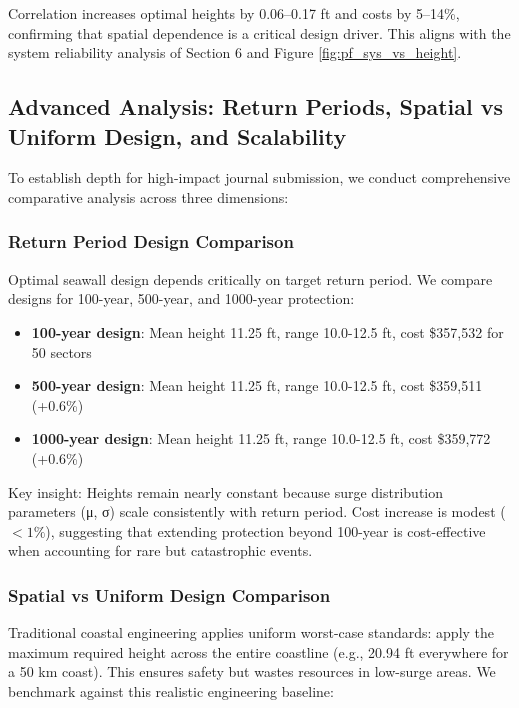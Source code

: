 \documentclass[review]{elsarticle}
\begin{document}
Correlation increases optimal heights by 0.06--0.17 ft and costs by 5--14\%, confirming that spatial dependence is a critical design driver. This aligns with the system reliability analysis of Section 6 and Figure \ref{fig:pf_sys_vs_height}.

\subsection{Advanced Analysis: Return Periods, Spatial vs Uniform Design, and Scalability}

To establish depth for high-impact journal submission, we conduct comprehensive comparative analysis across three dimensions:

\subsubsection{Return Period Design Comparison}

Optimal seawall design depends critically on target return period. We compare designs for 100-year, 500-year, and 1000-year protection:

\begin{itemize}
\item \textbf{100-year design}: Mean height 11.25 ft, range 10.0-12.5 ft, cost \$357,532 for 50 sectors
\item \textbf{500-year design}: Mean height 11.25 ft, range 10.0-12.5 ft, cost \$359,511 (+0.6\%)
\item \textbf{1000-year design}: Mean height 11.25 ft, range 10.0-12.5 ft, cost \$359,772 (+0.6\%)
\end{itemize}

Key insight: Heights remain nearly constant because surge distribution parameters (μ, σ) scale consistently with return period. Cost increase is modest ($<1\%$), suggesting that extending protection beyond 100-year is cost-effective when accounting for rare but catastrophic events.

\subsubsection{Spatial vs Uniform Design Comparison}

Traditional coastal engineering applies uniform worst-case standards: apply the maximum required height across the entire coastline (e.g., 20.94 ft everywhere for a 50 km coast). This ensures safety but wastes resources in low-surge areas. We benchmark against this realistic engineering baseline:
\end{document}
